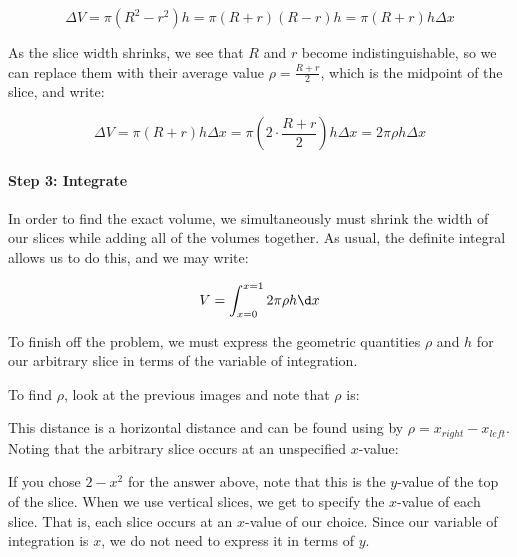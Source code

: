 \documentclass{ximera}
\begin{document}
\[
\Delta V = \pi (R^2-r^2)h = \pi(R+r)(R-r)h = \pi(R+r)h \Delta x
\] 

As the slice width shrinks, we see that $R$ and $r$ become indistinguishable, so we can replace them with their average value $\rho = \frac{R+r}{2}$, which is the midpoint of the slice, and write:

\[
\Delta V = \pi (R+r)h \Delta x = \pi (2 \cdot \frac{R+r}{2} )h \Delta x  = 2\pi \rho h \Delta x
\]        

\paragraph{Step 3: Integrate}
In order to find the exact volume, we simultaneously must shrink the width of our slices while adding all of the volumes together.  As usual, the definite integral allows us to do this, and we may write:

\[
V= \int_{x=0}^{x=1} 2 \pi \rho h \d x 
\]    

To finish off the problem, we must express the geometric quantities $\rho$ and $h$ for our arbitrary slice in terms of the variable of integration.

To find $\rho$, look at the previous images and note that $\rho$ is:

\begin{multipleChoice}
\end{multipleChoice}

This distance is a horizontal distance and can be found using by $\rho = x_{right}-x_{left}$.  Noting that the arbitrary slice occurs at an unspecified $x$-value:

\begin{multipleChoice}
\end{multipleChoice}
 
 \begin{feedback}
 If you chose $2-x^2$ for the answer above, note that this is the $y$-value of the top of the slice.  When we use vertical slices, we get to specify the $x$-value of each slice.  That is, each slice occurs at an $x$-value of our choice.  Since our variable of integration is $x$, we do not need to express it in terms of $y$.   
 \end{feedback}

\begin{multipleChoice}
\end{multipleChoice}
\end{document}
